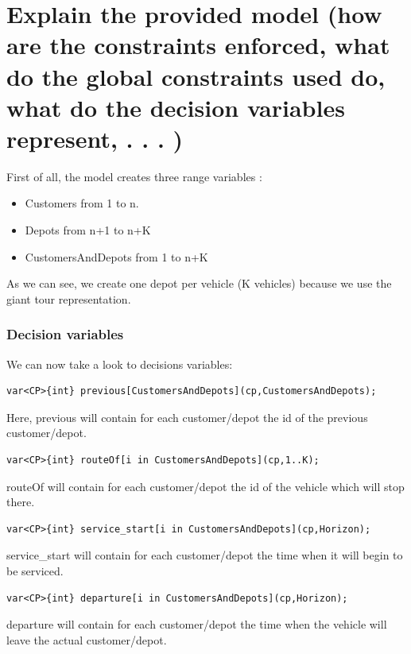 \documentclass[a4paper ,12pt,french]{article}
\begin{document}
\tableofcontents %

\thispagestyle{fancy}

\pagebreak
\setcounter{page}{1}
\pagestyle{fancy} %

\section{Explain the provided model (how are the constraints enforced, what do the global constraints used do, what do the decision variables represent, . . . )}



First of all, the model creates three range variables : 
\begin{itemize}
\item Customers from 1 to n.
\item Depots from n+1 to n+K
\item CustomersAndDepots from 1 to n+K
\end{itemize}
As we can see, we create one depot per vehicle (K vehicles) because we use the giant tour representation.\\

\subsubsection*{Decision variables}
We can now take a look to decisions variables:
\begin{verbatim}
var<CP>{int} previous[CustomersAndDepots](cp,CustomersAndDepots);
\end{verbatim}
Here, previous will contain for each customer/depot the id of the previous customer/depot.

\begin{verbatim}
var<CP>{int} routeOf[i in CustomersAndDepots](cp,1..K);
\end{verbatim}
routeOf will contain for each customer/depot the id of the vehicle which will stop there.

\begin{verbatim}
var<CP>{int} service_start[i in CustomersAndDepots](cp,Horizon);
\end{verbatim}
service\_start will contain for each customer/depot the time when it will begin to be serviced.

\begin{verbatim}
var<CP>{int} departure[i in CustomersAndDepots](cp,Horizon);
\end{verbatim}
departure will contain  for each customer/depot the time when the vehicle will leave the actual customer/depot.
\end{document}
